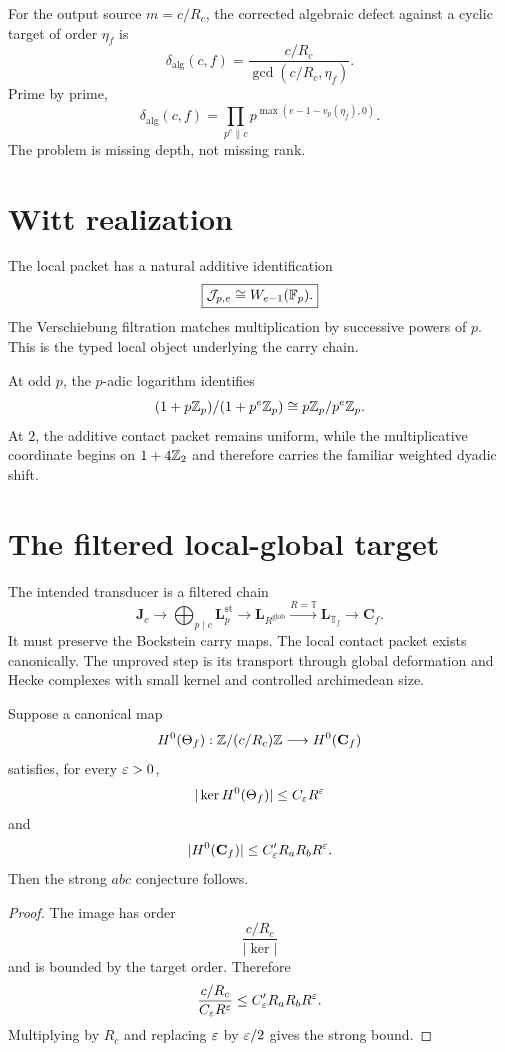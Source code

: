 For the output source $m=c/R_c$, the corrected algebraic defect against a cyclic target of order $\eta_f$ is
\[
 \boxed{
 \delta_{\mathrm{alg}}(c,f)
 =
 \frac{c/R_c}{\gcd(c/R_c,\eta_f)}.
 }
\]
Prime by prime,
\[
 \delta_{\mathrm{alg}}(c,f)
 =
 \prod_{p^e\parallel c}
 p^{\max(e-1-v_p(\eta_f),0)}.
\]
The problem is missing depth, not missing rank.

\section{Witt realization}
The local packet has a natural additive identification
\[
 \boxed{
 \mathcal J_{p,e}
 \cong
 W_{e-1}(\mathbb F_p).
 }
\]
The Verschiebung filtration matches multiplication by successive powers of $p$. This is the typed local object underlying the carry chain.

At odd $p$, the $p$-adic logarithm identifies
\[
 (1+p\mathbb Z_p)/(1+p^e\mathbb Z_p)
 \cong
 p\mathbb Z_p/p^e\mathbb Z_p.
\]
At $2$, the additive contact packet remains uniform, while the multiplicative coordinate begins on $1+4\mathbb Z_2$ and therefore carries the familiar weighted dyadic shift.

\section{The filtered local-global target}
The intended transducer is a filtered chain
\[
 \mathbf J_c
 \longrightarrow
 \bigoplus_{p\mid c}\mathbf L_p^{\mathrm{st}}
 \longrightarrow
 \mathbf L_{R^{\mathrm{glob}}}
 \xrightarrow{R=\mathbb T}
 \mathbf L_{\mathbb T_f}
 \longrightarrow
 \mathbf C_f.
\]
It must preserve the Bockstein carry maps. The local contact packet exists canonically. The unproved step is its transport through global deformation and Hecke complexes with small kernel and controlled archimedean size.

\begin{theorem}
Suppose a canonical map
\[
 H^0(\Theta_f):\mathbb Z/(c/R_c)\mathbb Z\longrightarrow H^0(\mathbf C_f)
\]
satisfies, for every $\varepsilon>0$,
\[
 |\ker H^0(\Theta_f)|\le C_\varepsilon R^\varepsilon
\]
and
\[
 |H^0(\mathbf C_f)|\le C'_\varepsilon R_aR_bR^\varepsilon.
\]
Then the strong $abc$ conjecture follows.
\end{theorem}

\begin{proof}
The image has order
\[
 \frac{c/R_c}{|\ker|}
\]
and is bounded by the target order. Therefore
\[
 \frac{c/R_c}{C_\varepsilon R^\varepsilon}
 \le
 C'_\varepsilon R_aR_bR^\varepsilon.
\]
Multiplying by $R_c$ and replacing $\varepsilon$ by $\varepsilon/2$ gives the strong bound.
\end{proof}
